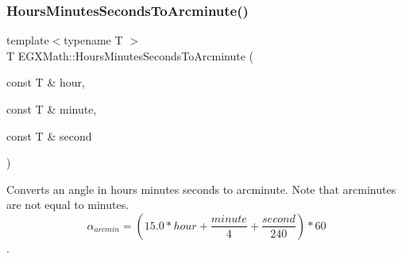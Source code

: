 \subsubsection{\texorpdfstring{Hours\+Minutes\+Seconds\+To\+Arcminute()}{HoursMinutesSecondsToArcminute()}}
{\footnotesize\ttfamily template$<$typename T $>$ \\
T E\+G\+X\+Math\+::\+Hours\+Minutes\+Seconds\+To\+Arcminute (\begin{DoxyParamCaption}\item[{const T \&}]{hour,  }\item[{const T \&}]{minute,  }\item[{const T \&}]{second }\end{DoxyParamCaption})}



Converts an angle in hours minutes seconds to arcminute. Note that arcminutes are not equal to minutes. \[\alpha_{arcmin}=(15.0 * hour + \frac{minute}{4} + \frac{second}{240}) * 60\]. 

